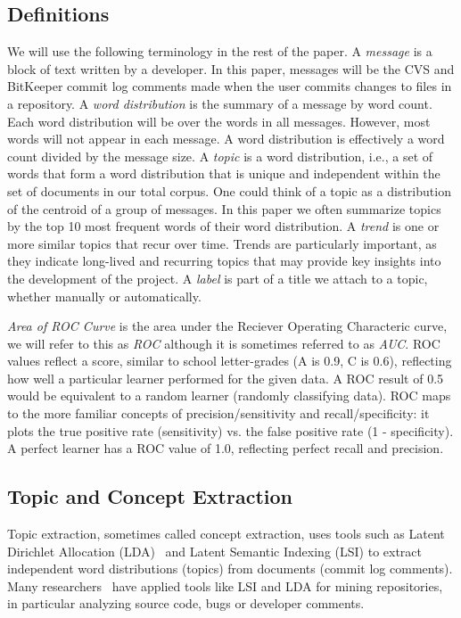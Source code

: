 \documentclass{acm_proc_article-sp}
\begin{document}
\subsection{Definitions}
We will use the following terminology in the rest of the paper.
A \emph{message} is a block of text written by a developer. In this
paper, messages will be the CVS and BitKeeper commit log comments made
when the user commits changes to files in a repository. A \emph{word
  distribution} is the summary of a message by word count. Each word
distribution will be over the words in all messages. However, most
words will not appear in each message. A word distribution is effectively
a word count divided by the message size. A \emph{topic} is a word
distribution, i.e., a set of words that form a word distribution that is
unique and independent within the set of documents in our total
corpus. One could think of a topic as a distribution of the centroid
of a group of messages. In this paper we often summarize topics by the
top 10 most frequent words of their word distribution.  A \emph{trend}
is one or more similar topics that recur over time.  Trends are
particularly important, as they indicate long-lived and recurring
topics that may provide key insights into the development of the
project. A \emph{label} is part of a title we attach to a topic, whether manually or automatically.

\emph{Area of ROC Curve} is the area under the Reciever Operating Characteric curve, we will refer to this as \emph{ROC} although it is sometimes referred to as \emph{AUC}. ROC values reflect a score, similar to school letter-grades (A is 0.9, C is 0.6), reflecting how well a particular learner performed for the given data. A ROC result of 0.5 would be equivalent to a random learner (randomly classifying data). ROC maps to the more familiar concepts of precision/sensitivity and recall/specificity: it plots the true positive rate (sensitivity) vs. the false positive rate (1 - specificity). A perfect learner has a ROC value of 1.0, reflecting perfect recall and precision.

\subsection{Topic and Concept Extraction}
Topic extraction, sometimes called concept extraction, uses tools such as Latent Dirichlet Allocation (LDA)~\cite{Blei2003} and Latent Semantic Indexing (LSI) to extract
independent word distributions (topics) from
	documents (commit log comments). Many researchers~\cite{marcus04wcre,Poshyvanyk2007,lukins08wcre,Linstead2007} have applied tools like LSI and LDA for mining repositories, in particular analyzing source code, bugs or developer comments.
\begin{comment}
Ideally these extracted topics 
correlate with actual development topics that the developers discussed
during the development of the software project. For example, our technique might identify a collection of words: ``list next has iterator add'', which we then identify (manually) as concerning the topics of collections and the Iterator pattern.
\end{comment}
\end{document}
